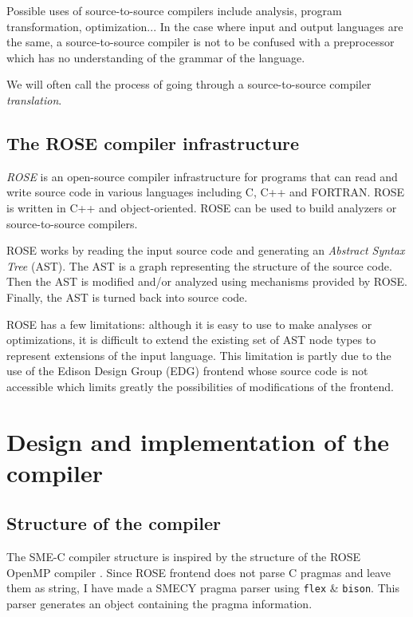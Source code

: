 \documentclass[a4paper]{article}
\begin{document}
	Possible uses of source-to-source compilers include analysis, program transformation, optimization... In the case where input and output languages are the same, a source-to-source compiler is not to be confused with a preprocessor which has no understanding of the grammar of the language.
	
	We will often call the process of going through a source-to-source compiler \emph{translation}.
	

	\subsection{The ROSE compiler infrastructure}
	\emph{ROSE} is an open-source compiler infrastructure for programs that can read and write source code in various languages including C, C++ and FORTRAN. ROSE is written in C++ and object-oriented. ROSE can be used to build analyzers or source-to-source compilers.
	
	ROSE works by reading the input source code and generating an \emph{Abstract Syntax Tree} (AST). The AST is a graph representing the structure of the source code. Then the AST is modified and/or analyzed using mechanisms provided by ROSE. Finally, the AST is turned back into source code.
	
	ROSE has a few limitations: although it is easy to use to make analyses or optimizations, it is difficult to extend the existing set of AST node types to represent extensions of the input language. This limitation is partly due to the use of the Edison Design Group (EDG) frontend whose source code is not accessible which limits greatly the possibilities of modifications of the frontend.
	
\section{Design and implementation of the compiler}

	\subsection{Structure of the compiler}
	The SME-C compiler structure is inspired by the structure of the ROSE OpenMP compiler \cite{roseomp}. Since ROSE frontend does not parse C pragmas and leave them as string, I have made a SMECY pragma parser using \texttt{flex} \& \texttt{bison}. This parser generates an object containing the pragma information.
	
\end{document}
